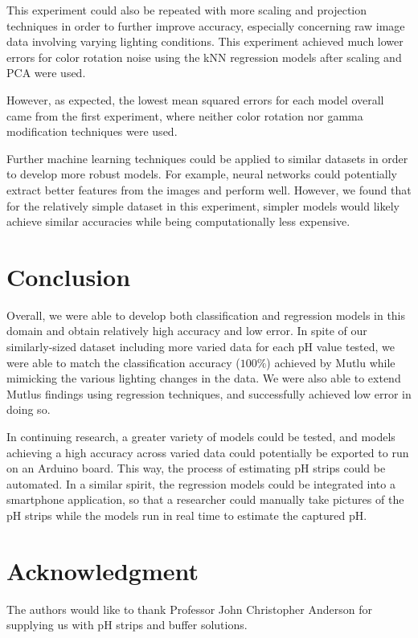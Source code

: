 \documentclass[journal]{IEEEtran}
\begin{document}
This experiment could also be repeated with more scaling and projection techniques in order to further improve accuracy, especially concerning raw image data involving varying lighting conditions. This experiment achieved much lower errors for color rotation noise using the kNN regression models after scaling and PCA were used. 

However, as expected, the lowest mean squared errors for each model overall came from the first experiment, where neither color rotation nor gamma modification techniques were used.

Further machine learning techniques could be applied to similar datasets in order to develop more robust models. For example, neural networks could potentially extract better features from the images and perform well. However, we found that for the relatively simple dataset in this experiment, simpler models would likely achieve similar accuracies while being computationally less expensive.

\section{Conclusion}
Overall, we were able to develop both classification and regression models in this domain and obtain relatively high accuracy and low error. In spite of our similarly-sized dataset including more varied data for each pH value tested, we were able to match the classification accuracy ($100\%$) achieved by Mutlu while mimicking the various lighting changes in the data. We were also able to extend Mutlu\textquotesingle s findings using regression techniques, and successfully achieved low error in doing so.

In continuing research, a greater variety of models could be tested, and models achieving a high accuracy across varied data could potentially be exported to run on an Arduino board. This way, the process of estimating pH strips could be automated. In a similar spirit, the regression models could be integrated into a smartphone application, so that a researcher could manually take pictures of the pH strips while the models run in real time to estimate the captured pH. 

\appendices
\section*{Acknowledgment}
The authors would like to thank Professor John Christopher Anderson for supplying us with pH strips and buffer solutions.
\end{document}
